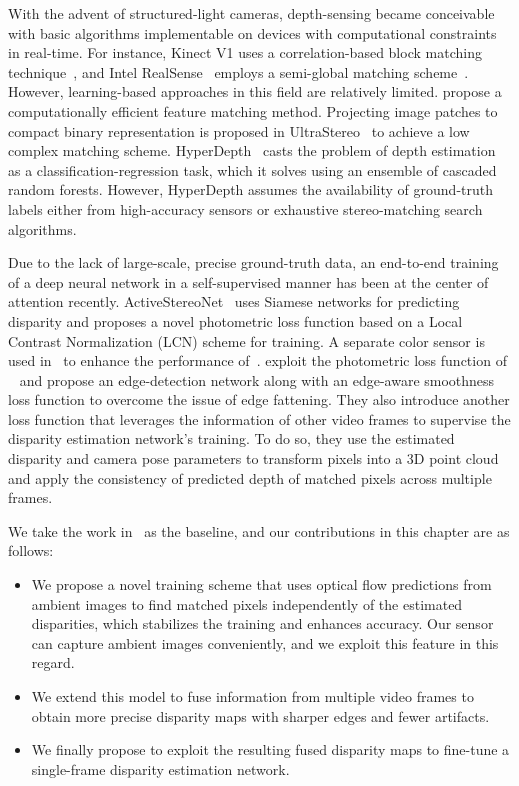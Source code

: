 With the advent of structured-light cameras, depth-sensing became conceivable with basic algorithms implementable on devices with computational constraints in real-time. For instance, Kinect V1 uses a correlation-based block matching technique~\citep{scharstein2002taxonomy}, and Intel RealSense~\citep{keselman2017intel} employs a semi-global matching scheme~\citep{hirschmuller2007stereo}. However, learning-based approaches in this field are relatively limited. \cite{ryan2017low} propose a computationally efficient feature matching method. Projecting image patches to compact binary representation is proposed in UltraStereo~\citep{fanello2017ultrastereo} to achieve a low complex matching scheme. HyperDepth~\citep{ryan2016hyperdepth} casts the problem of depth estimation as a classification-regression task, which it solves using an ensemble of cascaded random forests. However, HyperDepth assumes the availability of ground-truth labels either from high-accuracy sensors or exhaustive stereo-matching search algorithms.

Due to the lack of large-scale, precise ground-truth data, an end-to-end training of a deep neural network in a self-supervised manner has been at the center of attention recently. ActiveStereoNet~\citep{zhang2018activestereonet} uses Siamese networks for predicting disparity and proposes a novel photometric loss function based on a Local Contrast Normalization (LCN) scheme for training. A separate color sensor is used in~\cite{kleitsiotis2019color} to enhance the performance of~\cite{zhang2018activestereonet}. \cite{riegler2019connecting} exploit the photometric loss function of ~\cite{zhang2018activestereonet} and propose an edge-detection network along with an edge-aware smoothness loss function to overcome the issue of edge fattening. They also introduce another loss function that leverages the information of other video frames to supervise the disparity estimation network's training. To do so, they use the estimated disparity and camera pose parameters to transform pixels into a 3D point cloud and apply the consistency of predicted depth of matched pixels across multiple frames.

We take the work in~\cite{riegler2019connecting} as the baseline, and our contributions in this chapter are as follows:
\begin{itemize}
\item We propose a novel training scheme that uses optical flow predictions from ambient images to find matched pixels independently of the estimated disparities, which stabilizes the training and enhances accuracy. Our sensor can capture ambient images conveniently, and we exploit this feature in this regard.
\item We extend this model to fuse information from multiple video frames to obtain more precise disparity maps with sharper edges and fewer artifacts.
\item We finally propose to exploit the resulting fused disparity maps to fine-tune a single-frame disparity estimation network.
\end{itemize}


